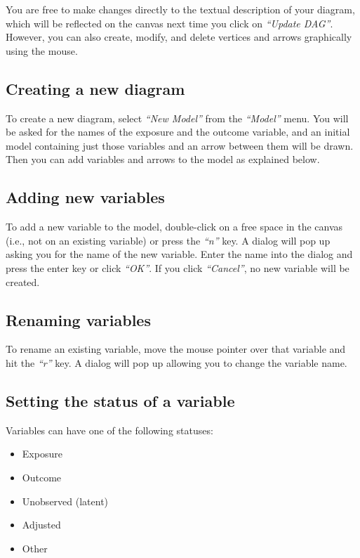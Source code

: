 \documentclass[a4paper]{article} %
\newcommand{\action}[1]{\emph{``#1''}}
\begin{document}
\label{sec:diagramediting}

You are free to make changes directly to the textual description of your
diagram, which will be reflected on the canvas next time you click on \action{Update DAG}.
However, you can also create, modify, and delete vertices and arrows graphically
using the mouse.

\subsection{Creating a new diagram}

To create a new diagram, select \action{New Model} from the \action{Model} menu.
You will be asked
for the names of the exposure and the outcome variable, and an initial model containing
just those variables and an arrow between them will be drawn. Then you can
add variables and arrows to the model as explained below. 

\subsection{Adding new variables}

To add a new variable to the model, double-click on a free space in the canvas
(i.e., not on an existing variable) or press the \action{n} key. A dialog will
pop up asking you for the name of the new variable. Enter the name into the dialog
and press the enter key or click \action{OK}. If you click \action{Cancel}, no new 
variable will be created.

\subsection{Renaming variables}

To rename an existing variable, move the
mouse pointer over that variable and hit the \action{r} key. A dialog
will pop up allowing you to change the variable name.

\subsection{Setting the status of a variable}

Variables can have one of the following 
statuses:

\begin{itemize} 
\item Exposure
\item Outcome
\item Unobserved (latent)
\item Adjusted
\item Other
\end{itemize}
\end{document}
